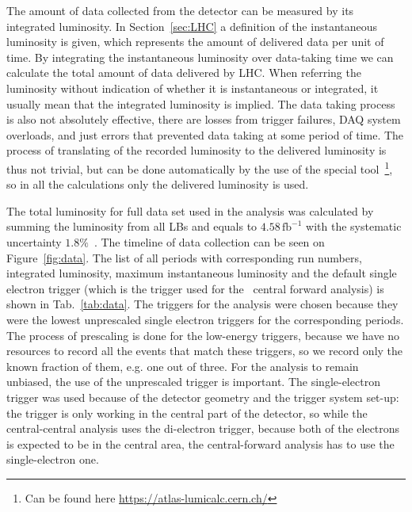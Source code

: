 The amount of data collected from the detector can be measured by its integrated luminosity. In Section~\ref{sec:LHC} a definition of the instantaneous luminosity is given, which represents the amount of delivered data per unit of time. By integrating the instantaneous luminosity over data-taking time we can calculate the total amount of data delivered by LHC. When referring the luminosity without indication of whether it is instantaneous or integrated, it usually mean that the integrated luminosity is implied. The data taking process is also not absolutely effective, there are losses from trigger failures, DAQ system overloads, and just errors that prevented data taking at some period of time. The process of translating of the recorded luminosity to the delivered luminosity is thus not trivial, but can be done automatically by the use of the special tool~\footnote{Can be found here \url{https://atlas-lumicalc.cern.ch/}}, so in all the calculations only the delivered luminosity is used.

The total luminosity for full data set used in the analysis was calculated by summing the luminosity from all LBs and equals to \ensuremath{4.58\,\mathrm{fb}^{-1}} with the systematic uncertainty $1.8\%$~\cite{lib:lumi}. The timeline of data collection can be seen on Figure~\ref{fig:data}. The list of all periods with corresponding run numbers, integrated luminosity, maximum instantaneous luminosity and the default single electron trigger (which is the trigger used for the \Zee\ central forward analysis) is shown in Tab.~\ref{tab:data}. The triggers for the analysis were chosen because they were the lowest unprescaled single electron triggers for the corresponding periods. The process of prescaling is done for the low-energy triggers, because we have no resources to record all the events that match these triggers, so we record only the known fraction of them, e.g. one out of three. For the analysis to remain unbiased, the use of the unprescaled trigger is important. The single-electron trigger was used because of the detector geometry and the trigger system set-up: the trigger is only working in the central part of the detector, so while the central-central analysis uses the di-electron trigger, because both of the electrons is expected to be in the central area, the central-forward analysis has to use the single-electron one.

